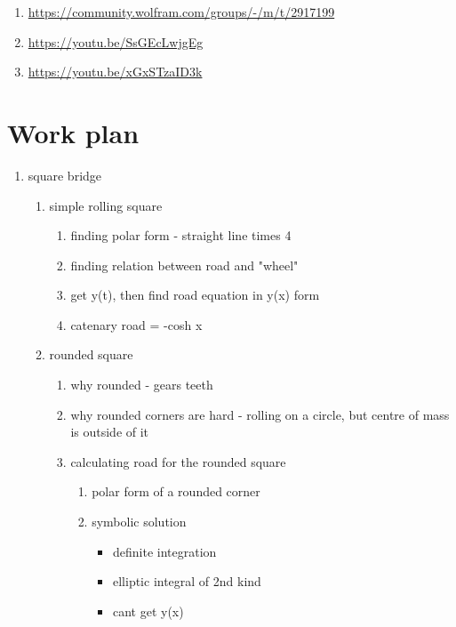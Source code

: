 \documentclass[12pt]{article}
\begin{document}
        \begin{enumerate}
            \item \url{https://community.wolfram.com/groups/-/m/t/2917199}
            \item \url{https://youtu.be/SsGEcLwjgEg}
            \item \url {https://youtu.be/xGxSTzaID3k}
        \end{enumerate}

    \newpage

    \section{Work plan}

        \begin{enumerate}
            \item square bridge \begin{enumerate}
                \item simple rolling square \begin{enumerate}
                    \item finding polar form - straight line times 4
                    \item finding relation between road and "wheel"
                    \item get y(t), then find road equation in y(x) form
                    \item catenary road = -cosh x
                \end{enumerate}
                \item rounded square \begin{enumerate}
                    \item why rounded - gears teeth
                    \item why rounded corners are hard - rolling on a circle, but centre of mass is outside of it
                    \item calculating road for the rounded square \begin{enumerate}
                        \item polar form of a rounded corner
                        \item symbolic solution \begin{itemize}
                            \item definite integration
                            \item elliptic integral of 2nd kind
                            \item cant get y(x)

\end{itemize}
\end{enumerate}
\end{enumerate}
\end{enumerate}
\end{enumerate}
\end{document}

